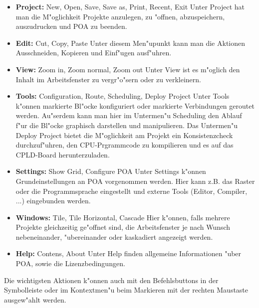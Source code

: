 \documentclass[a4paper,titlepage,12pt,ngerman]{scrbook}
\begin{document}
\begin{itemize}
\item {\bf Project:}	New, Open, Save, Save as, Print, Recent, Exit\newline
Unter Project hat man die M"oglichkeit Projekte anzulegen, zu "offnen, abzuspeichern, auszudrucken und POA zu beenden.
\item {\bf Edit:}	Cut, Copy, Paste\newline
Unter diesem Men"upunkt kann man die Aktionen Ausschneiden, Kopieren und Einf"ugen ausf"uhren.
\item {\bf View:}	Zoom in, Zoom normal, Zoom out\newline
Unter View ist es m"oglich den Inhalt im Arbeitsfenster zu vergr"o"sern oder zu
verkleinern.
\item {\bf Tools:} 	Configuration, Route, Scheduling, Deploy Project\newline
Unter Tools k"onnen markierte Bl"ocke konfiguriert oder markierte Verbindungen geroutet werden. Au"serdem kann man hier im Untermen"u Scheduling den Ablauf f"ur die Bl"ocke graphisch darstellen und manipulieren. Das Untermen"u Deploy Project bietet die M"oglichkeit am Projekt ein Konsistenzcheck durchzuf"uhren, den CPU-Prgrammcode zu kompilieren und es auf das CPLD-Board herunterzuladen.
\item {\bf Settings:}	Show Grid, Configure POA\newline
Unter Settings k"onnen Grundeinstellungen an POA vorgenommen werden. Hier kann z.B. das Raster oder die Programmsprache eingestellt und externe Tools (Editor, Compiler, ...) eingebunden werden.
\item {\bf Windows:} 	Tile, Tile Horizontal, Cascade\newline
Hier k"onnen, falls mehrere Projekte gleichzeitig ge"offnet sind, die Arbeitsfenster je nach Wunsch nebeneinander, "ubereinander oder kaskadiert angezeigt werden.
\item {\bf Help:} 	Contens, About\newline
Unter Help finden allgemeine Informationen "uber POA, sowie die Lizenzbedingungen.\par
\end{itemize}

Die wichtigsten Aktionen k"onnen auch mit den Befehlsbuttons in der Symbolleiste oder im Kontextmen"u beim Markieren mit der rechten Maustaste ausgew"ahlt werden.
\end{document}
